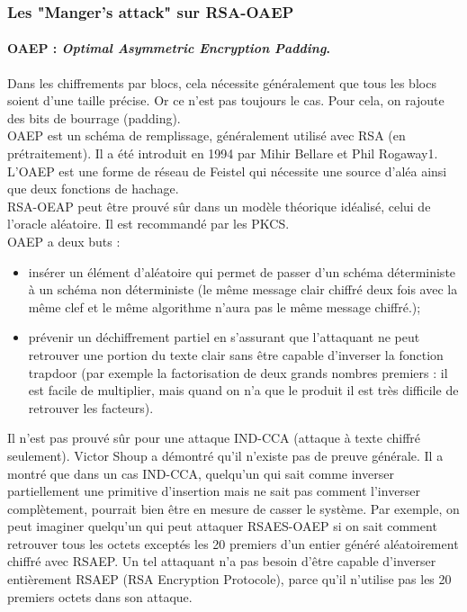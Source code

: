 \subsubsection{Les "Manger's attack" sur RSA-OAEP}
\paragraph{OAEP : \textit{Optimal Asymmetric Encryption Padding}. \\}
Dans les chiffrements par blocs, cela nécessite généralement que tous les blocs soient d'une taille précise. Or ce n'est pas toujours le cas. Pour cela, on rajoute des bits de bourrage (padding).\\
OAEP est un schéma de remplissage, généralement utilisé avec RSA (en prétraitement). Il a été introduit en 1994 par Mihir Bellare et Phil Rogaway1. L'OAEP est une forme de réseau de Feistel qui nécessite une source d'aléa ainsi que deux fonctions de hachage.\\
RSA-OEAP peut être prouvé sûr dans un modèle théorique idéalisé, celui de l'oracle aléatoire. Il est recommandé par les PKCS.\\
OAEP a deux buts :
\begin{itemize}
\item insérer un élément d'aléatoire qui permet de passer d'un schéma déterministe à un schéma non déterministe (le même message clair chiffré deux fois avec la même clef et le même algorithme n'aura pas le même message chiffré.);
\item prévenir un déchiffrement partiel en s'assurant que l'attaquant ne peut retrouver une portion du texte clair sans être capable d'inverser la fonction trapdoor (par exemple la factorisation de deux grands nombres premiers : il est facile de multiplier, mais quand on n'a que le produit il est très difficile de retrouver les facteurs).\\
\end{itemize}
Il n'est pas prouvé sûr pour une attaque IND-CCA (attaque à texte chiffré seulement). Victor Shoup a démontré qu'il n'existe pas de preuve générale.
Il a montré que dans un cas IND-CCA, quelqu'un qui sait comme inverser partiellement une primitive d'insertion mais ne sait pas comment l'inverser complètement, pourrait bien être en mesure de casser le système. Par exemple, on peut imaginer quelqu'un qui peut attaquer RSAES-OAEP si on sait comment retrouver tous les octets exceptés les 20 premiers d'un entier généré aléatoirement chiffré avec RSAEP. Un tel attaquant n'a pas besoin d'être capable d'inverser entièrement RSAEP (RSA Encryption Protocole), parce qu'il n'utilise pas les 20 premiers octets dans son attaque.\\


